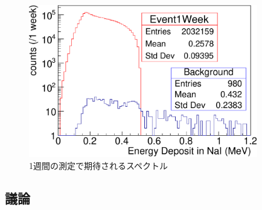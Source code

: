 \begin{figure}[htbp]
	\centering
		\includegraphics[width=10cm]{fig/test_all.pdf}
	\caption{1週間の測定で期待されるスペクトル}
	\label{test_all}
\end{figure}

\subsection{議論}

